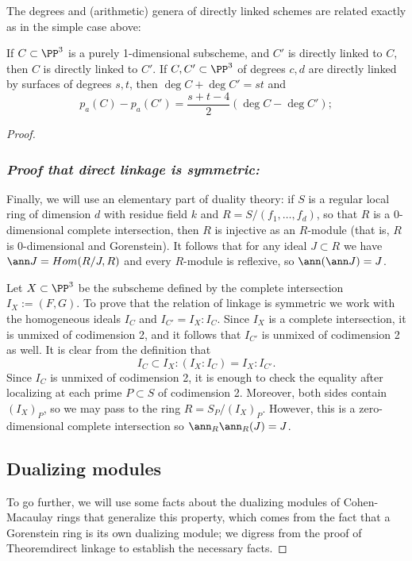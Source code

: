 The degrees and (arithmetic) genera 
of directly linked schemes are related exactly as in the simple case above:

\begin{theorem}\label{direct linkage}
If $C\subset \PP^3$ is a purely 1-dimensional subscheme, and ${C'}$ is directly linked to $C$, then $C$ is directly linked to ${C'}$.
If $C,{C'}\subset \PP^3$ of degrees $c,d$ are directly linked by surfaces of degrees $s,t$, then 
$\deg C+\deg C' = st$ and 
 \begin{equation}\label{linked genus formula}
p_a(C) - p_a({C'}) = \frac{s+t-4}{2}(\deg C - \deg C');
\end{equation}
\end{theorem}

\begin{proof}
 
\subsubsection{\it Proof that direct linkage is symmetric:}

Finally, we will use an elementary part of duality theory: if $S$ is a regular local ring of dimension $d$
with residue field $k$ and $R = S/(f_1,\dots, f_d)$, 
so that $R$ is a 0-dimensional complete intersection, then $R$ is injective as an $R$-module (that is, $R$ is 0-dimensional  and Gorenstein).
It follows that for any ideal $J\subset R$ we have $\ann J = Hom(R/J, R)$ and every $R$-module is reflexive,
so $\ann(\ann J) = J$.

Let $X\subset \PP^3$ be the subscheme defined by the complete intersection $I_X := (F,G)$.
To prove that the relation of linkage is symmetric we work with
the homogeneous ideals $I_C$ and $I_{C'} = I_X: I_C$. 
Since $I_X$ is a complete intersection, it is unmixed of codimension 2, and it
follows that $I_{C'}$ is unmixed of codimension 2 as well.
It is clear from the definition that
$$
I_C \subset I_X:(I_X:I_C) = I_X:I_{C'}.
$$
Since $I_C$ is unmixed of codimension 2, it is enough to check the equality
after localizing at each prime $P\subset S$ of codimension 2.
Moreover, both sides contain $(I_X)_P$, so we may pass to the ring $R = S_P/(I_X)_P$.
However, this is a zero-dimensional complete intersection so $\ann_R\ann_R(J) = J$.

\subsection{Dualizing modules}\label{duality}
To go further, we will use some facts about the dualizing modules of Cohen-Macaulay rings that generalize this
property, which comes from the fact that a Gorenstein ring is its own dualizing module; we digress from the 
proof of Theorem{direct linkage} to establish the necessary facts.


\end{proof}
